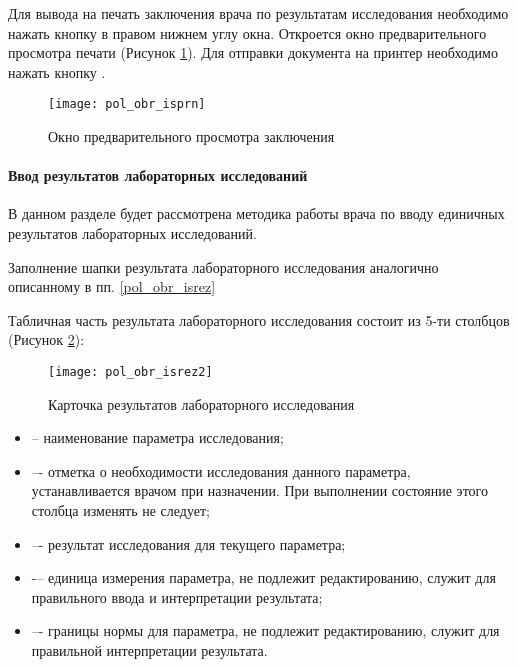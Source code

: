 

Для вывода на печать заключения врача по результатам исследования необходимо нажать кнопку  в правом нижнем углу окна. Откроется окно предварительного просмотра печати (Рисунок \ref{img_pol_obr_isprn}). Для отправки документа на принтер необходимо нажать кнопку .

 \begin{figure}[ht]\centering
   \texttt{[image: pol\_obr\_isprn]}
   \caption{Окно предварительного просмотра заключения}
   \label{img_pol_obr_isprn}
 \end{figure}

\paragraph{Ввод результатов лабораторных исследований} \label{pol_obr_rez}
 
В данном разделе будет рассмотрена методика работы врача по вводу единичных результатов лабораторных исследований.

Заполнение шапки результата лабораторного исследования аналогично описанному в пп. \ref{pol_obr_isrez}

Табличная часть результата лабораторного исследования состоит из 5-ти столбцов (Рисунок \ref{img_pol_obr_isrez2}):

 \begin{figure}[ht]\centering
   \texttt{[image: pol\_obr\_isrez2]}
   \caption{Карточка результатов лабораторного исследования}
   \label{img_pol_obr_isrez2}
 \end{figure}
 
\begin{itemize}
 \item {} -- наименование параметра исследования;
 \item {} –- отметка о необходимости исследования данного параметра, устанавливается врачом при назначении. При выполнении состояние этого столбца изменять не следует;
 \item {} –- результат исследования для текущего параметра;
 \item {} -– единица измерения параметра, не подлежит редактированию, служит для правильного ввода и интерпретации результата;
 \item {} –- границы нормы для параметра, не подлежит редактированию, служит для правильной интерпретации результата.
\end{itemize}

